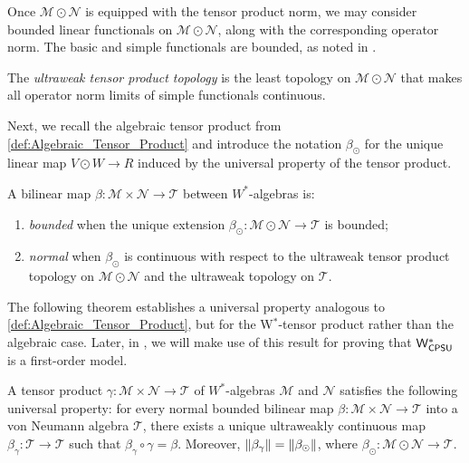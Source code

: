 Once \( \mathscr{M} \odot \mathscr{N} \) is equipped with the tensor product norm, we may consider bounded linear functionals on $\mathscr{M} \odot \mathscr{N}$, along with the corresponding operator norm.  The basic and simple functionals are bounded, as noted in \cite[Definition 112 II (3)]{westerbaanCategoryNeumannAlgebras2019}.
\begin{definition}
The \emph{ultraweak tensor product topology} is the least topology on $\mathscr{M} \odot \mathscr{N}$
that makes all operator norm limits of simple functionals continuous.
\end{definition}

Next, we recall the algebraic tensor product from \autoref{def:Algebraic_Tensor_Product} and introduce the notation \( \beta_{\odot} \) for the unique linear map \( V \odot W \to R \) induced by the universal property of the tensor product.

A bilinear map $\beta\colon \mathscr{M}  \times \mathscr{N} \to \mathscr{T}$ between $W^*$-algebras is:
\begin{enumerate}
    \item \emph{bounded} when the unique extension $\beta_\odot\colon \mathscr{M} \odot \mathscr{N} \to \mathscr{T}$ is bounded;
    \item \emph{normal} when $\beta_\odot$ is continuous with respect to the ultraweak tensor product topology on $\mathscr{M} \odot \mathscr{N}$ and the ultraweak topology on $\mathscr{T}$.
\end{enumerate}


The following theorem establishes a universal property analogous to \autoref{def:Algebraic_Tensor_Product}, but for the W$^*$-tensor product rather than the algebraic case. Later, in ,  we will make use of this result for proving that $\mathsf{W^*_{CPSU}}$ is a first-order model.

\begin{theorem} \cite[Theorem 112 XI]{westerbaanCategoryNeumannAlgebras2019} \label{thm:beta_alg_eq_beta_gamma}
A tensor product $\gamma\colon \mathscr{M} \times \mathscr{N} \to \mathcal{T}$ of $W^*$-algebras $\mathscr{M}$ and $\mathscr{N}$ satisfies the following universal property: for every normal bounded bilinear map $\beta\colon  \mathscr{M} \times  \mathscr{N} \to \mathscr{T}$ into a von Neumann algebra $\mathscr{T}$, there exists a unique ultraweakly continuous map $\beta_\gamma\colon \mathcal{T} \to \mathscr{T}$ such that $\beta_\gamma \circ \gamma = \beta$. Moreover, $ \left\lVert \beta_\gamma \right\rVert = \left\lVert \beta_\odot \right\rVert$, where $
\beta_\odot\colon  \mathscr{M} \odot  \mathscr{N} \to \mathscr{T}.
$
\end{theorem}

